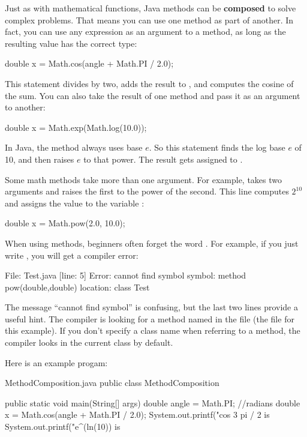 
Just as with mathematical functions, Java methods can be {\bf composed} to solve complex problems.
That means you can use one method as part of another.
In fact, you can use any expression as an argument to a method, as long as the resulting value has the correct type:

\begin{code}
double x = Math.cos(angle + Math.PI / 2.0);
\end{code}

This statement divides  by two, adds the result to , and computes the cosine of the sum.
You can also take the result of one method and pass it as an argument to another:

\begin{code}
double x = Math.exp(Math.log(10.0));
\end{code}

In Java, the  method always uses base $e$.
So this statement finds the log base $e$ of 10, and then raises $e$ to that power.
The result gets assigned to .

Some math methods take more than one argument.
For example,  takes two arguments and raises the first to the power of the second.
This line computes $2^{10}$ and assigns the value  to the variable :

\begin{code}
double x = Math.pow(2.0, 10.0);
\end{code}

When using  methods, beginners often forget the word .
For example, if you just write , you will get a compiler error:

\begin{stdout}
File: Test.java  [line: 5]
Error: cannot find symbol
  symbol:   method pow(double,double)
  location: class Test
\end{stdout}

The message ``cannot find symbol'' is confusing, but the last two lines provide a useful hint.
The compiler is looking for a method named  in the file  (the file for this example).
If you don't specify a class name when referring to a method, the compiler looks in the current class by default.

Here is an example progam:
\begin{trinket} [210] {MethodComposition.java}
public class MethodComposition {

    public static void main(String[] args) {
       double angle = Math.PI; //radians
       double x = Math.cos(angle + Math.PI / 2.0);
       System.out.printf("cos 3 pi / 2 is %
       System.out.printf("e^(ln(10)) is %
    }
}
\end{trinket}

